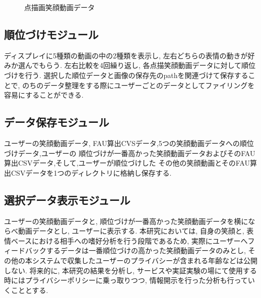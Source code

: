 \begin{figure}[htbp]
    \begin{center}
    \end{center}
    \caption{点描画笑顔動画データ}
    \label{fig:showdata}
\end{figure}

\subsection{順位づけモジュール}
ディスプレイに5種類の動画の中の2種類を表示し, 左右どちらの表情の動きが好みか選んでもらう.
左右比較を4回繰り返し, 各点描笑顔動画データに対して順位づけを行う.
選択した順位データと画像の保存先のpathを関連づけて保存することで,
のちのデータ整理をする際にユーザーごとのデータとしてファイリングを容易にすることができる.

\subsection{データ保存モジュール}
ユーザーの笑顔動画データ, FAU算出CVSデータ,5つの笑顔動画データへの順位づけデータ,ユーザーの
順位づけが一番高かった笑顔動画データおよびそのFAU算出CSVデータ,そして,ユーザーが順位づけした
その他の笑顔動画とそのFAU算出CSVデータを1つのディレクトリに格納し保存する.

\subsection{選択データ表示モジュール}
ユーザーの笑顔動画データと, 順位づけが一番高かった笑顔動画データを横にならべ動画データとし,
ユーザーに表示する. 本研究においては, 自身の笑顔と, 表情ベースにおける相手への嗜好分析を行う段階であるため,
実際にユーザーへフィードバックするデータは一番順位づけの高かった笑顔動画データのみとし,
その他の本システムで収集したユーザーのプライバシーが含まれる年齢などは公開しない.
将来的に, 本研究の結果を分析し, サービスや実証実験の場にて使用する時にはプライバシーポリシーに乗っ取りつつ,
情報開示を行った分析も行っていくこととする.


